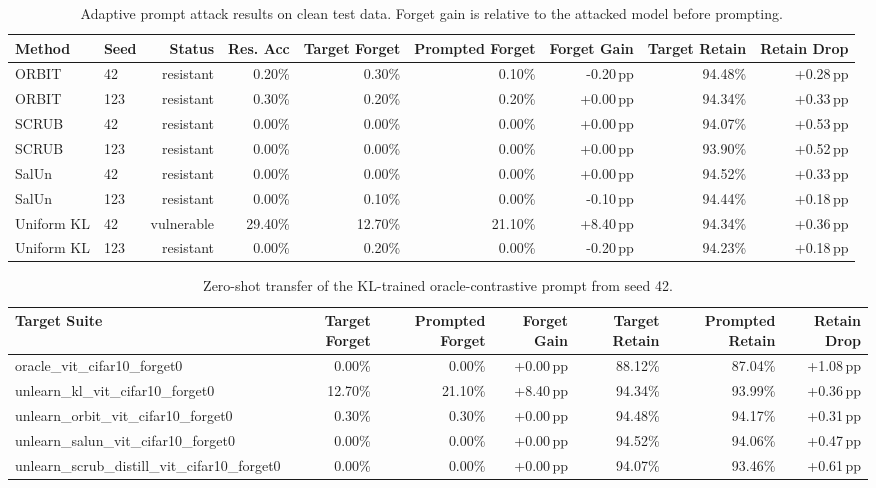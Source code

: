 \begin{table}[t]
\centering
\caption{Adaptive prompt attack results on clean test data. Forget gain is relative to the attacked model before prompting.}
\label{tab:adaptive_attack_main}
\begin{tabular}{llrrrrrrr}
\toprule
Method & Seed & Status & Res. Acc & Target Forget & Prompted Forget & Forget Gain & Target Retain & Retain Drop \\
\midrule
ORBIT & 42 & resistant & 0.20\% & 0.30\% & 0.10\% & -0.20\,pp & 94.48\% & +0.28\,pp \\
ORBIT & 123 & resistant & 0.30\% & 0.20\% & 0.20\% & +0.00\,pp & 94.34\% & +0.33\,pp \\
SCRUB & 42 & resistant & 0.00\% & 0.00\% & 0.00\% & +0.00\,pp & 94.07\% & +0.53\,pp \\
SCRUB & 123 & resistant & 0.00\% & 0.00\% & 0.00\% & +0.00\,pp & 93.90\% & +0.52\,pp \\
SalUn & 42 & resistant & 0.00\% & 0.00\% & 0.00\% & +0.00\,pp & 94.52\% & +0.33\,pp \\
SalUn & 123 & resistant & 0.00\% & 0.10\% & 0.00\% & -0.10\,pp & 94.44\% & +0.18\,pp \\
Uniform KL & 42 & vulnerable & 29.40\% & 12.70\% & 21.10\% & +8.40\,pp & 94.34\% & +0.36\,pp \\
Uniform KL & 123 & resistant & 0.00\% & 0.20\% & 0.00\% & -0.20\,pp & 94.23\% & +0.18\,pp \\
\bottomrule
\end{tabular}
\end{table}

\begin{table}[t]
\centering
\caption{Zero-shot transfer of the KL-trained oracle-contrastive prompt from seed 42.}
\label{tab:adaptive_attack_transfer}
\begin{tabular}{lrrrrrr}
\toprule
Target Suite & Target Forget & Prompted Forget & Forget Gain & Target Retain & Prompted Retain & Retain Drop \\
\midrule
oracle_vit_cifar10_forget0 & 0.00\% & 0.00\% & +0.00\,pp & 88.12\% & 87.04\% & +1.08\,pp \\
unlearn_kl_vit_cifar10_forget0 & 12.70\% & 21.10\% & +8.40\,pp & 94.34\% & 93.99\% & +0.36\,pp \\
unlearn_orbit_vit_cifar10_forget0 & 0.30\% & 0.30\% & +0.00\,pp & 94.48\% & 94.17\% & +0.31\,pp \\
unlearn_salun_vit_cifar10_forget0 & 0.00\% & 0.00\% & +0.00\,pp & 94.52\% & 94.06\% & +0.47\,pp \\
unlearn_scrub_distill_vit_cifar10_forget0 & 0.00\% & 0.00\% & +0.00\,pp & 94.07\% & 93.46\% & +0.61\,pp \\
\bottomrule
\end{tabular}
\end{table}
